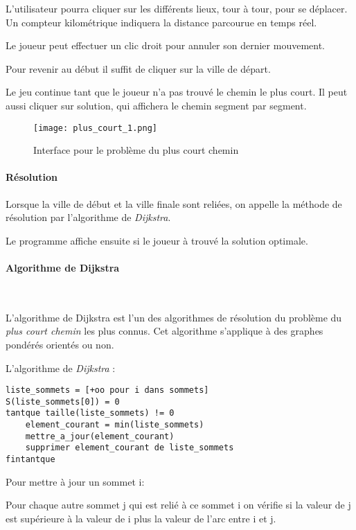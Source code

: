         L'utilisateur pourra cliquer sur les différents lieux, tour à tour,
        pour se déplacer. Un compteur kilométrique indiquera la
        distance parcourue en temps réel.

        Le joueur peut effectuer un clic droit pour annuler son dernier
        mouvement.

        Pour revenir au début il suffit de cliquer sur la ville de départ.

        Le jeu continue tant que le joueur n'a pas trouvé le chemin
        le plus court. Il peut aussi cliquer sur \og solution\fg, qui
        affichera le chemin segment par segment.

\begin{figure}[h]
\begin{center}
    \texttt{[image: plus\_court\_1.png]} 
    \caption{Interface pour le problème du plus court chemin}
\end{center}
\end{figure}

        \paragraph{Résolution}
            Lorsque la ville de début et la ville finale sont reliées,
            on appelle la méthode de résolution par l'algorithme de \emph{Dijkstra}.

            Le programme affiche ensuite si le joueur à trouvé la solution optimale.

		\paragraph{Algorithme de Dijkstra} ~

			L'algorithme de Dijkstra est l'un des algorithmes de résolution du problème du
			\emph{plus court chemin} les plus connus. Cet algorithme s'applique à des graphes pondérés orientés ou non.

			L'algorithme de \emph{Dijkstra} :
			\begin{lstlisting}
liste_sommets = [+oo pour i dans sommets]
S(liste_sommets[0]) = 0
tantque taille(liste_sommets) != 0
    element_courant = min(liste_sommets)
    mettre_a_jour(element_courant)
    supprimer element_courant de liste_sommets
fintantque
			\end{lstlisting}
			Pour mettre à jour un sommet i:

				Pour chaque autre sommet j qui est relié à ce sommet i on vérifie si
				la valeur de j est supérieure à la valeur de i plus la valeur de l'arc entre i et j.

